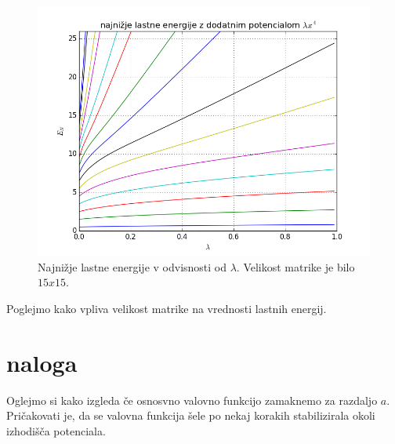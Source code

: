 \documentclass[slovene,11pt,a4paper]{article}
\numberwithin{equation}{section} %
\numberwithin{figure}{section} %
\numberwithin{table}{section} %
\begin{document}
\begin{figure}[!htb]
\centering
\includegraphics[scale=0.45]{slike/najnizje_energije.png}


\caption{Najnižje lastne energije v odvisnosti od $\lambda$. Velikost matrike je bilo $15x15$.}
\end{figure}
\newpage
Poglejmo kako vpliva velikost matrike na vrednosti lastnih energij.













\newpage

\section{naloga}
Oglejmo si kako izgleda če osnosvno valovno funkcijo zamaknemo za razdaljo $a$. Pričakovati je, da se valovna funkcija šele po nekaj korakih stabilizirala okoli izhodišča potenciala.
\end{document}
